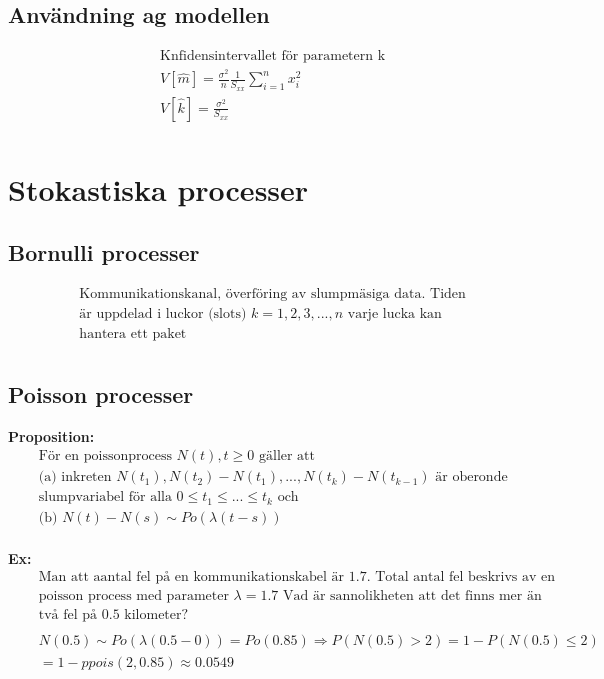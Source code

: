 \subsection{Användning ag modellen}
\begin{align*}
  &\quad  \text{Knfidensintervallet för parametern k} \\
  &\quad  V[\hat{m}]=\frac{\sigma^2}{n}\frac{1}{S_{xx}} \sum_{i=1}^{n}x^2_i \\
  &\quad  V[\hat{k}]=\frac{\sigma^2}{S_{xx}} \\
\end{align*}

\section{Stokastiska processer}
\subsection{Bornulli processer}
\begin{align*}
  &\quad  \text{Kommunikationskanal, överföring av slumpmäsiga data. Tiden} \\
  &\quad  \text{är uppdelad i luckor (slots) $k=1,2,3,...,n$ varje lucka kan} \\
  &\quad  \text{hantera ett paket} \\
\end{align*}

\subsection{Poisson processer}
\textbf{Proposition:}
\begin{align*}
  &\quad  \text{För en poissonprocess $N(t), t \geq 0$ gäller att } \\
  &\quad  \text{(a) inkreten $N(t_1),N(t_2)-N(t_1),...,N(t_k)-N(t_{k-1})$ är oberonde} \\
  &\quad  \text{slumpvariabel för alla $0\leq t_1 \leq ... \leq t_k$ och } \\
  &\quad  \text{(b) } N(t) - N(s) \sim Po(\lambda(t-s)) \\
\end{align*}

\textbf{Ex:}
\begin{align*}
  &\quad  \text{Man att aantal fel på en kommunikationskabel är $1.7$. Total antal fel beskrivs av en} \\
  &\quad  \text{poisson process med parameter $\lambda=1.7$ Vad är sannolikheten att det finns mer än } \\
  &\quad  \text{två fel på $0.5$ kilometer?} \\
  &\quad  \\
  &\quad  N(0.5)\sim Po(\lambda(0.5-0))=Po(0.85) \Rightarrow P(N(0.5)>2) = 1-P(N(0.5)\leq2) \\
  &\quad  = 1-ppois(2, 0.85) \approx 0.0549 \\
\end{align*}

